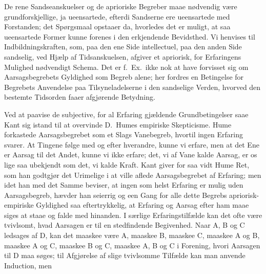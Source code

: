 \documentclass[12pt]{article}
\newcommand{\opage}[1]{\marginnote{\footnotesize\textit{[#1]}}}
\begin{document}
De rene Sandseanskuelser og de aprioriske Begreber maae
nødvendig være grundforskjellige, ja ueensartede, efterdi
Sandserne ere ueensartede med Forstanden; det Spørgsmaal
opstaaer da, hvorledes det er muligt, at saa ueensartede Former
kunne forenes i den erkjendende Bevidsthed. Vi henvises til
Indbildningskraften, som, paa den ene Side intellectuel, paa den
anden Side sandselig, ved Hjælp af Tidsanskuelsen, afgiver et
apriorisk, for Erfaringens Mulighed nødvendigt Schema. Det
er f.\ Ex.\ ikke nok at have forvisset sig om Aarsagsbegrebets
Gyldighed som Begreb alene; her fordres en Betingelse for
Begrebets Anvendelse paa Tilsyneladelserne i den sandselige
Verden, hvorved den bestemte Tidsorden faaer afgjørende
Betydning.

Ved at paavise de subjective, for al Erfaring gjældende
Grundbetingelser saae Kant sig istand til at overvinde D.\ Humes
empiriske Skepticisme. Hume forkastede Aarsagsbegrebet
som et Slags Vanebegreb, hvortil ingen Erfaring svarer. At
Tingene følge med og efter hverandre, kunne vi erfare, men at
det Ene er Aarsag til det Andet, kunne vi ikke erfare; det, vi
af Vane kalde Aarsag, er os lige saa ubekjendt som det, vi
kalde Kraft. Kant giver for saa vidt Hume Ret, som han
godtgjør det Urimelige i at ville aflede Aarsagsbegrebet af
Erfaring; men idet han med det Samme beviser, at ingen som
helst Erfaring er mulig uden Aarsagsbegreb, hævder han seier\-rig
og een Gang for alle dette Begrebs apriorisk-empiriske
Gyldighed saa eftertrykkelig, at Erfaring og Aarsag efter ham
maae siges at staae og falde med hinanden. I særlige
Erfaringstilfælde kan det ofte være tvivlsomt, hvad Aarsagen er
til en stedfindende Begivenhed. Naar A, B og C ledsages af D,
\opage{7} kan det maaskee være A, maaskee B, maaskee C, maaskee A
og B, maaskee A og C, maaskee B og C, maaskee A, B og C i
Forening, hvori Aarsagen til D maa søges; til Afgjørelse af
slige tvivlsomme Tilfælde kan man anvende Induction, men
\end{document}
